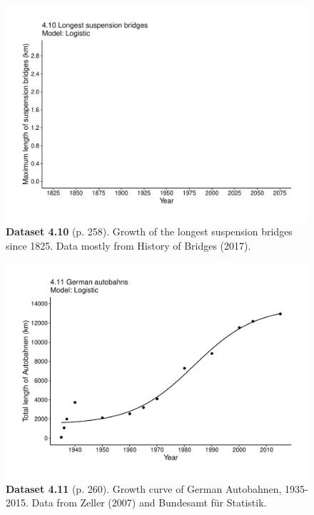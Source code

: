 \documentclass[aps,rmp,preprint,superscriptaddress,10pt,onecolumn]{article}
\begin{document}
\clearpage
\begin{figure}[h]
\includegraphics[width=\textwidth]{output/figs-ggplot/4.10.pdf}
\caption*{\textbf{Dataset 4.10} (p. 258). Growth of the longest suspension bridges since 1825. Data mostly from History of Bridges (2017).}
\end{figure}
	
\clearpage
\begin{figure}[h]
\includegraphics[width=\textwidth]{output/figs-ggplot/4.11.pdf}
\caption*{\textbf{Dataset 4.11} (p. 260). Growth curve of German Autobahnen, 1935-2015. Data from Zeller (2007) and Bundesamt für Statistik.}
\end{figure}
	
\end{document}
